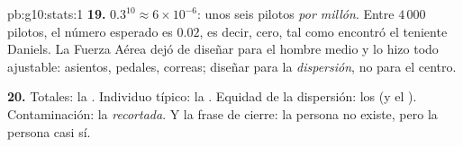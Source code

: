 \begin{solution}{pb:g10:stats:1}
\textbf{19.} $0.3^{10} \approx 6 \times 10^{-6}$: unos seis pilotos
\emph{por millón}. Entre $4\,000$ pilotos, el número esperado es $0.02$,
es decir, cero, tal como encontró el teniente Daniels. La Fuerza Aérea
dejó de diseñar para el hombre medio y lo hizo todo ajustable: asientos,
pedales, correas; diseñar para la \emph{dispersión}, no para el centro.

\textbf{20.} Totales: la \emph{}. Individuo típico: la
\emph{}. Equidad de la dispersión: los \emph{} (y el
). Contaminación: la \emph{ recortada}. Y la
frase de cierre: la persona  no existe, pero la persona  casi
sí.
\end{solution}
